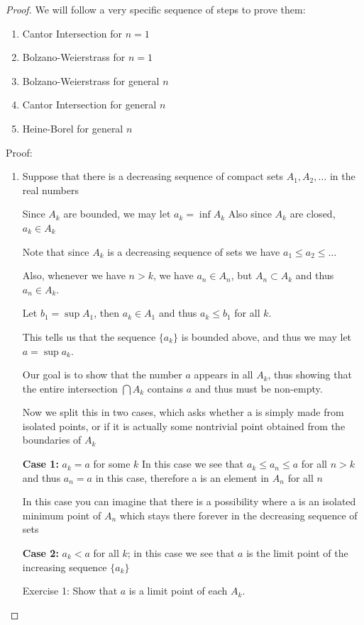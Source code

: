 \begin{proof}
We will follow a very specific sequence of steps to prove them:
\begin{enumerate}
\item Cantor Intersection for $n=1$
\item Bolzano-Weierstrass for $n=1$
\item Bolzano-Weierstrass for general $n$
\item Cantor Intersection for general $n$
\item Heine-Borel for general $n$
\end{enumerate}

Proof:
\begin{enumerate}
\item Suppose that there is a decreasing sequence of compact sets $A_1, A_2, \dots$ in the real numbers

Since $A_k$ are bounded, we may let $a_k=\inf A_k$
Also since $A_k$ are closed, $a_k \in A_k$

Note that since $A_k$ is a decreasing sequence of sets we have $a_1\le a_2\le\dots$

Also, whenever we have $n>k$, we have $a_n \in A_n$, but $A_n \subset A_k$ and thus $a_n \in A_k$.

Let $b_1=\sup A_1$, then $a_k \in A_1$ and thus $a_k\le b_1$ for all $k$.

This tells us that the sequence $\{a_k\}$ is bounded above, and thus we may let $a=\sup a_k$.

Our goal is to show that the number $a$ appears in all $A_k$, thus showing that the entire intersection $\bigcap A_k$ contains $a$ and thus must be non-empty.

Now we split this in two cases, which asks whether a is simply made from isolated points, or if it is actually some nontrivial point obtained from the boundaries of $A_k$

\textbf{Case 1:} $a_k=a$ for some $k$
In this case we see that $a_k\le a_n\le a$ for all $n>k$ and thus $a_n=a$ in this case, therefore a is an element in $A_n$ for all $n$

In this case you can imagine that there is a possibility where a is an isolated minimum point of $A_n$ which stays there forever in the decreasing sequence of sets

\textbf{Case 2:} $a_k<a$ for all $k$; in this case we see that $a$ is the limit point of the increasing sequence $\{a_k\}$

Exercise 1: Show that $a$ is a limit point of each $A_k$.


\end{enumerate}
\end{proof}
